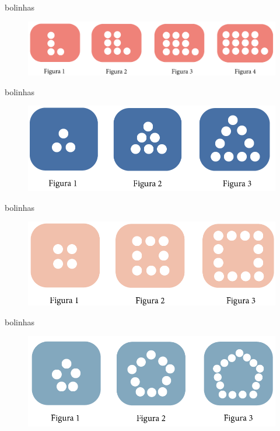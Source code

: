 \begin{escolha}
\item{} bolinhas

\begin{figure}[htpb!]
\centering
\includegraphics[width=.4\textwidth]{../ilustracoes/MAT5/SAEB_5ANO_MAT_figura23.png}
\end{figure}

\bigskip


\item{} bolinhas

\begin{figure}[htpb!]
\centering
\includegraphics[width=.4\textwidth]{../ilustracoes/MAT5/SAEB_5ANO_MAT_figura24.png}
\end{figure}

\bigskip


\item{} bolinhas

\begin{figure}[htpb!]
\centering
\includegraphics[width=.4\textwidth]{../ilustracoes/MAT5/SAEB_5ANO_MAT_figura25.png}
\end{figure}

\bigskip


\item{} bolinhas

\begin{figure}[htpb!]
\centering
\includegraphics[width=.4\textwidth]{../ilustracoes/MAT5/SAEB_5ANO_MAT_figura26.png}
\end{figure}

\bigskip

\end{escolha}

